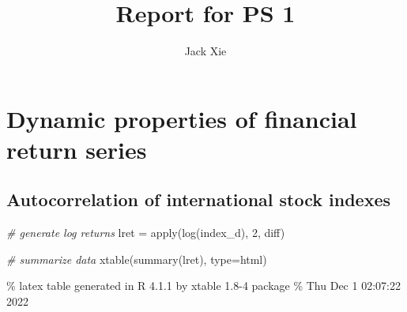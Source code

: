 \documentclass[
]{article}
\title{Report for PS 1}
\author{Jack Xie}
\date{}
\newenvironment{Shaded}{\begin{snugshade}}{\end{snugshade}}
\newcommand{\AttributeTok}[1]{\textcolor[rgb]{0.77,0.63,0.00}{#1}}
\newcommand{\CommentTok}[1]{\textcolor[rgb]{0.56,0.35,0.01}{\textit{#1}}}
\newcommand{\DecValTok}[1]{\textcolor[rgb]{0.00,0.00,0.81}{#1}}
\newcommand{\FunctionTok}[1]{\textcolor[rgb]{0.00,0.00,0.00}{#1}}
\newcommand{\NormalTok}[1]{#1}
\newcommand{\OtherTok}[1]{\textcolor[rgb]{0.56,0.35,0.01}{#1}}
\newcommand{\StringTok}[1]{\textcolor[rgb]{0.31,0.60,0.02}{#1}}
\begin{document}
\maketitle

\hypertarget{dynamic-properties-of-financial-return-series}{%
\section{Dynamic properties of financial return
series}\label{dynamic-properties-of-financial-return-series}}

\hypertarget{autocorrelation-of-international-stock-indexes}{%
\subsection{Autocorrelation of international stock
indexes}\label{autocorrelation-of-international-stock-indexes}}

\begin{Shaded}
\begin{Highlighting}[]
\CommentTok{\# generate log returns}
\NormalTok{lret }\OtherTok{=} \FunctionTok{apply}\NormalTok{(}\FunctionTok{log}\NormalTok{(index\_d), }\DecValTok{2}\NormalTok{, diff)}

\CommentTok{\# summarize data}
\FunctionTok{xtable}\NormalTok{(}\FunctionTok{summary}\NormalTok{(lret), }\AttributeTok{type=}\StringTok{\textquotesingle{}html\textquotesingle{}}\NormalTok{)}
\end{Highlighting}
\end{Shaded}

\% latex table generated in R 4.1.1 by xtable 1.8-4 package \% Thu Dec 1
02:07:22 2022
\end{document}
